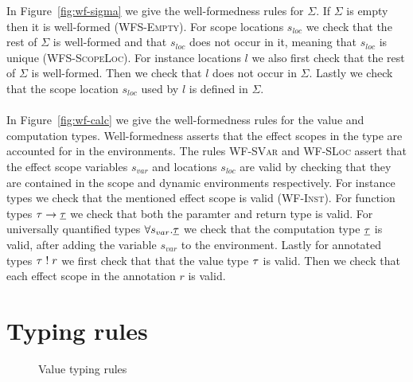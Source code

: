 {In Figure~\ref{fig:wf-sigma} we give the well-formedness rules for $\Sigma$.
If $\Sigma$ is empty then it is well-formed (\textsc{WFS-Empty}).
For scope locations $s_{loc}$ we check that the rest of $\Sigma$ is well-formed and that $s_{loc}$ does not occur in it, meaning that $s_{loc}$ is unique (\textsc{WFS-ScopeLoc}).
For instance locations $l$ we also first check that the rest of $\Sigma$ is well-formed.
Then we check that $l$ does not occur in $\Sigma$.
Lastly we check that the scope location $s_{loc}$ used by $l$ is defined in $\Sigma$.
\\\\
In Figure~\ref{fig:wf-calc} we give the well-formedness rules for the value and computation types.
Well-formedness asserts that the effect scopes in the type are accounted for in the environments.
The rules \textsc{WF-SVar} and \textsc{WF-SLoc} assert that the effect scope variables $s_{var}$ and locations $s_{loc}$ are valid by checking that they are contained in the scope and dynamic environments respectively.
For instance types we check that the mentioned effect scope is valid (\textsc{WF-Inst}).
For function types $\tau \rightarrow \underline{\tau}$ we check that both the paramter and return type is valid.
For universally quantified types $\forall s_{var} . \underline{\tau}$ we check that the computation type $\underline{\tau}$ is valid, after adding the variable $s_{var}$ to the environment.
Lastly for annotated types $\tau \; ! \; r$ we first check that that the value type $\tau$ is valid.
Then we check that each effect scope in the annotation $r$ is valid.

\section{Typing rules}
\label{sec:typingrules}

\begin{figure}[h]
\caption{Value typing rules}
\centering
{}
\end{figure}

}
